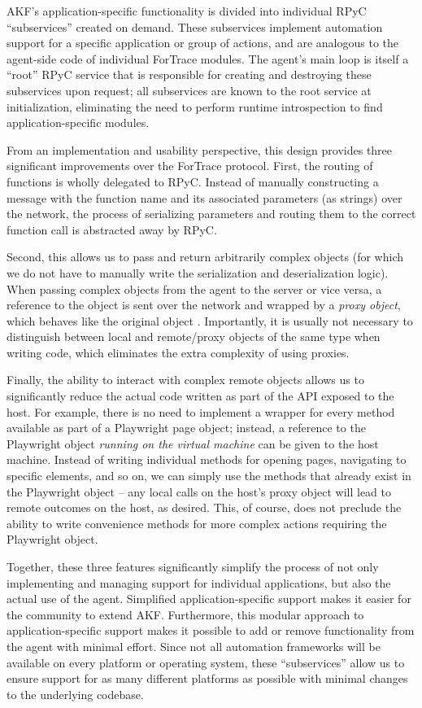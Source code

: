 AKF's application-specific functionality is divided into individual RPyC
``subservices'' created on demand. These subservices implement
automation support for a specific application or group of actions, and
are analogous to the agent-side code of individual ForTrace modules. The
agent's main loop is itself a ``root'' RPyC service that is responsible
for creating and destroying these subservices upon request; all
subservices are known to the root service at initialization, eliminating
the need to perform runtime introspection to find application-specific
modules.

From an implementation and usability perspective, this design provides
three significant improvements over the ForTrace protocol. First, the
routing of functions is wholly delegated to RPyC. Instead of manually
constructing a message with the function name and its associated
parameters (as strings) over the network, the process of serializing
parameters and routing them to the correct function call is abstracted
away by RPyC.

Second, this allows us to pass and return arbitrarily complex objects
(for which we do not have to manually write the serialization and
deserialization logic). When passing complex objects from the agent to
the server or vice versa, a reference to the object is sent over the
network and wrapped by a \emph{proxy object}, which behaves like the
original object \cite{TheoryOperationRPyC}. Importantly, it is
usually not necessary to distinguish between local and remote/proxy
objects of the same type when writing code, which eliminates the extra
complexity of using proxies.

Finally, the ability to interact with complex remote objects allows us
to significantly reduce the actual code written as part of the API
exposed to the host. For example, there is no need to implement a
wrapper for every method available as part of a Playwright page object;
instead, a reference to the Playwright object \emph{running on the
virtual machine} can be given to the host machine. Instead of writing
individual methods for opening pages, navigating to specific elements,
and so on, we can simply use the methods that already exist in the
Playwright object -- any local calls on the host's proxy object will
lead to remote outcomes on the host, as desired. This, of course, does
not preclude the ability to write convenience methods for more complex
actions requiring the Playwright object.

Together, these three features significantly simplify the process of not
only implementing and managing support for individual applications, but
also the actual use of the agent. Simplified application-specific
support makes it easier for the community to extend AKF. Furthermore,
this modular approach to application-specific support makes it possible
to add or remove functionality from the agent with minimal effort. Since
not all automation frameworks will be available on every platform or
operating system, these ``subservices'' allow us to ensure support for
as many different platforms as possible with minimal changes to the
underlying codebase.

